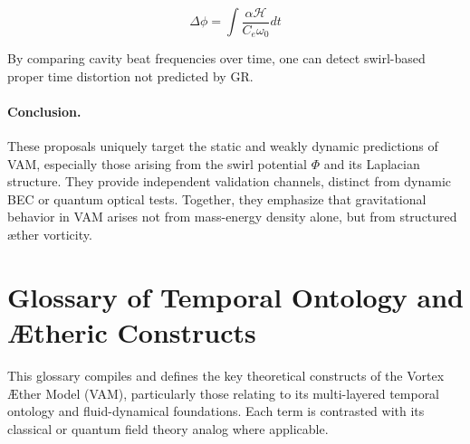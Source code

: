 \documentclass[preprint]{revtex4-2}
\begin{document}
            \begin{equation}
                \Delta \phi = \int \frac{\alpha \mathcal{H}}{C_e \omega_0} dt
            \end{equation}
        
            By comparing cavity beat frequencies over time, one can detect swirl-based proper time distortion not predicted by GR.
        
            \paragraph{Conclusion.} These proposals uniquely target the static and weakly dynamic predictions of VAM, especially those arising from the swirl potential \( \Phi \) and its Laplacian structure. They provide independent validation channels, distinct from dynamic BEC or quantum optical tests. Together, they emphasize that gravitational behavior in VAM arises not from mass-energy density alone, but from structured æther vorticity.

        \section{Glossary of Temporal Ontology and Ætheric Constructs}\label{sec:glossary}
            This glossary compiles and defines the key theoretical constructs of the Vortex \AE{}ther Model (VAM), particularly those relating to its multi-layered temporal ontology and fluid-dynamical foundations. Each term is contrasted with its classical or quantum field theory analog where applicable.
        
\end{document}
